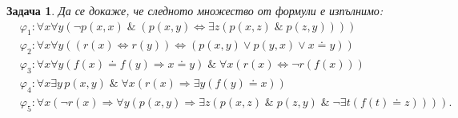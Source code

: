 \documentclass[12pt]{article}
\newcommand{\calL}{\mathcal{L}}
\newtheorem{problem}{Задача}[section]
\theoremstyle{definition}
\theoremstyle{remark}
\newtheorem*{remark}{Забележка}
\begin{document}
\begin{problem}
Да се докаже, че следното множество от формули е изпълнимо:
\begin{align*}
       & \varphi_1 : \forall x \forall y (\neg p(x, x) \; \& \; (p(x, y) \Leftrightarrow \exists z (p(x, z) \; \& \; p(z, y))))                                      \\
       & \varphi_2 : \forall x \forall y ((r(x) \Leftrightarrow r(y)) \Leftrightarrow (p(x, y) \lor p(y, x) \lor x \doteq y))                                        \\
       & \varphi_3 : \forall x \forall y (f(x) \doteq f(y) \Rightarrow x \doteq y) \; \& \; \forall x (r(x) \Leftrightarrow \neg r(f(x)))                            \\
       & \varphi_4 : \forall x \exists y \, p(x, y) \; \& \; \forall x (r(x) \Rightarrow \exists y (f(y) \doteq x))                                                  \\
       & \varphi_5 : \forall x (\neg r(x) \Rightarrow \forall y (p(x, y) \Rightarrow \exists z (p(x, z) \; \& \; p(z, y) \; \& \; \neg \exists t (f(t) \doteq z)))).
\end{align*}
\end{problem}

\newpage



\end{document}
